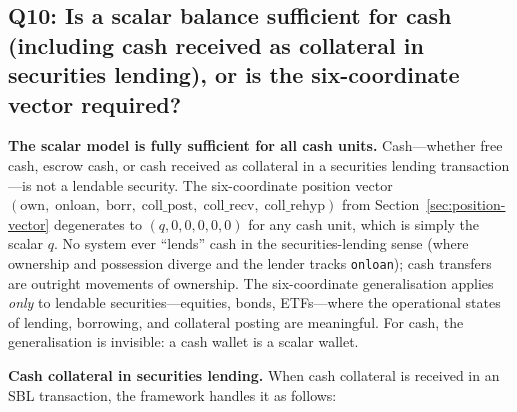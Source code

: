 \documentclass[11pt,a4paper]{article}
\begin{document}
\subsection*{Q10: Is a scalar balance sufficient for cash (including cash received as collateral in securities lending), or is the six-coordinate vector required?}

\textbf{The scalar model is fully sufficient for all cash units.} Cash---whether free cash, escrow cash, or cash received as collateral in a securities lending transaction---is not a lendable security. The six-coordinate position vector $(\mathrm{own},\; \mathrm{onloan},\; \mathrm{borr},\; \mathrm{coll\_post},\; \mathrm{coll\_recv},\; \mathrm{coll\_rehyp})$ from Section~\ref{sec:position-vector} degenerates to $(q, 0, 0, 0, 0, 0)$ for any cash unit, which is simply the scalar $q$. No system ever ``lends'' cash in the securities-lending sense (where ownership and possession diverge and the lender tracks \texttt{onloan}); cash transfers are outright movements of ownership. The six-coordinate generalisation applies \emph{only} to lendable securities---equities, bonds, ETFs---where the operational states of lending, borrowing, and collateral posting are meaningful. For cash, the generalisation is invisible: a cash wallet is a scalar wallet.

\medskip
\noindent\textbf{Cash collateral in securities lending.} When cash collateral is received in an SBL transaction, the framework handles it as follows:
\end{document}
